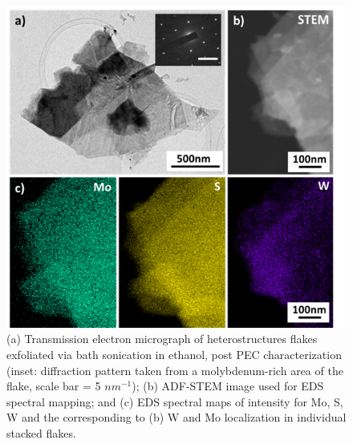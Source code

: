\begin{figure}[h]
	\begin{center}
		\includegraphics[scale=0.3]{Heterostructures/TEMImages.png}
		\caption{(a) Transmission electron micrograph of heterostructures flakes exfoliated via bath sonication in ethanol, post PEC characterization (inset: diffraction pattern taken from a molybdenum-rich area of the flake, scale bar = 5 $nm^{-1}$); (b) ADF-STEM image used for EDS spectral mapping; and (c) EDS spectral maps of intensity for Mo, S, W and the corresponding to (b) W and Mo localization in individual stacked flakes.}
		\label{fig:HeterostructuresTEMImages}
	\end{center}
\end{figure}


